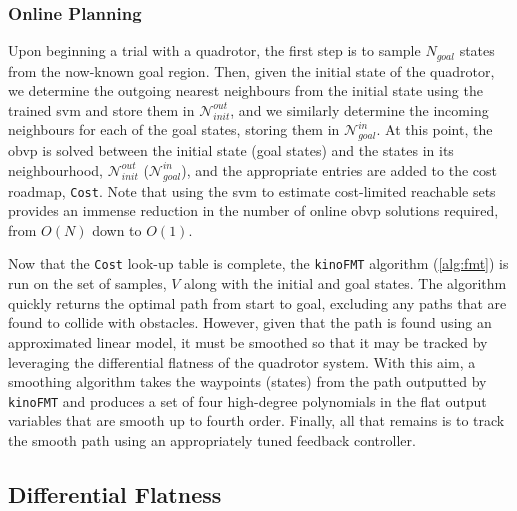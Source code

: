 \subsubsection{Online Planning}

Upon beginning a trial with a quadrotor, the first step is to sample $N_{goal}$ states from the now-known goal region. Then, given the initial state of the quadrotor, we determine the outgoing nearest neighbours from the initial state using the trained \gls{svm} and store them in $\mathcal{N}_{init}^{out}$, and we similarly determine the incoming neighbours for each of the goal states, storing them in $\mathcal{N}_{goal}^{in}$. At this point, the \gls{obvp} is solved between the initial state (goal states) and the states in its neighbourhood, $\mathcal{N}_{init}^{out}$ ($\mathcal{N}_{goal}^{in}$), and the appropriate entries are added to the cost roadmap, \texttt{Cost}. Note that using the \gls{svm} to estimate cost-limited reachable sets provides an immense reduction in the number of online \gls{obvp} solutions required, from $O(N)$ down to $O(1)$.

Now that the \texttt{Cost} look-up table is complete, the \texttt{kinoFMT} algorithm (\autoref{alg:fmt}) is run on the set of samples, $V$ along with the initial and goal states. The algorithm quickly returns the optimal path from start to goal, excluding any paths that are found to collide with obstacles. However, given that the path is found using an approximated linear model, it must be smoothed so that it may be tracked by leveraging the differential flatness of the quadrotor system. With this aim, a smoothing algorithm takes the waypoints (states) from the path outputted by \texttt{kinoFMT} and produces a set of four high-degree polynomials in the flat output variables that are smooth up to fourth order. Finally, all that remains is to track the smooth path using an appropriately tuned feedback controller.
 



\subsection{Differential Flatness}\label{quad:diff_flat}

